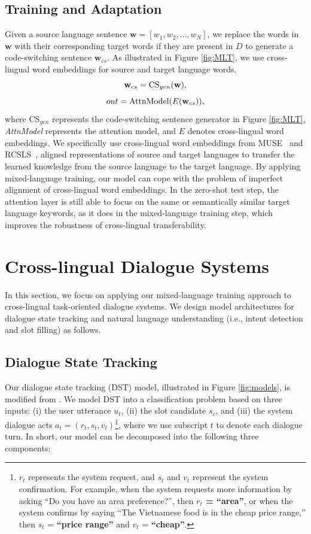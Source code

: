 \documentclass[letterpaper]{article}
\newcommand{\citet}[1]{\citeauthor{#1} \shortcite{#1}}
\begin{document}
\subsection{Training and Adaptation}

Given a source language sentence $\mathbf{w}=[w_1,w_2,\dots,w_N]$, we replace the words in $\mathbf{w}$ with their corresponding target words if they are present in $D$ to generate a code-switching sentence $\mathbf{w}_{cs}$.
As illustrated in Figure \ref{fig:MLT}, we use cross-lingual word embeddings for source and target language words.
\begin{equation}
    \mathbf{w}_{cs} = \textnormal{CS}_{gen}(\mathbf{w}),
\end{equation}
\begin{equation}
    out = \textnormal{AttnModel}(E(\mathbf{w}_{cs})),
\end{equation}
where CS$_{gen}$ represents the code-switching sentence generator in Figure \ref{fig:MLT}, \textit{AttnModel} represents the attention model, and $E$ denotes cross-lingual word embeddings. We specifically use cross-lingual word embeddings from MUSE~\cite{conneau2017word} and RCSLS~\cite{joulin2018loss}, aligned representations of source and target languages to transfer the learned knowledge from the source language to the target language. By applying mixed-language training, our model can cope with the problem of imperfect alignment of cross-lingual word embeddings. In the zero-shot test step, the attention layer is still able to focus on the same or semantically similar target language keywords, as it does in the mixed-language training step, which improves the robustness of cross-lingual transferability.

\section{Cross-lingual Dialogue Systems}
In this section, we focus on applying our mixed-language training approach to cross-lingual task-oriented dialogue systems. We design model architectures for dialogue state tracking and natural language understanding (i.e., intent detection and slot filling) as follows.

\subsection{Dialogue State Tracking}
Our dialogue state tracking (DST) model, illustrated in Figure \ref{fig:models}, is modified from \citet{chen2018xl}. We model DST into a classification problem based on three inputs: (i) the user utterance $ u_t $, (ii) the slot candidate $ s_c $, and (iii) the system dialogue acts $ a_t = (r_t, s_t, v_t) $\footnote{$r_t$ represents the system request, and $s_t$ and $v_t$ represent the system confirmation. For example, when the system requests more information by asking ``Do you have an area preference?'', then \textbf{$r_t$ = ``area''}, or when the system confirms by saying ``The Vietnamese food is in the cheap price range,'' then $s_t$ = \textbf{``price range''} and $v_t$ = \textbf{``cheap''}.}, where we use subscript $t$ to denote each dialogue turn. In short, our model can be decomposed into the following three components:
\end{document}
